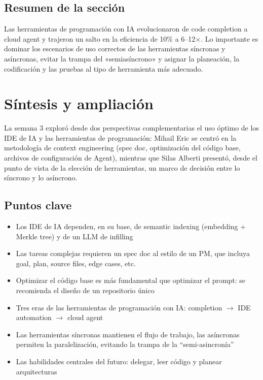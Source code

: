 \documentclass[a4paper]{article}
\begin{document}
\subsection{Resumen de la sección}

Las herramientas de programación con IA evolucionaron de code completion a cloud agent y trajeron un salto en la eficiencia de 10\% a 6--12$\times$. Lo importante es dominar los escenarios de uso correctos de las herramientas síncronas y asíncronas, evitar la trampa del «semiasíncrono» y asignar la planeación, la codificación y las pruebas al tipo de herramienta más adecuado.
\section{Síntesis y ampliación}

La semana 3 exploró desde dos perspectivas complementarias el uso óptimo de los IDE de IA y las herramientas de programación: Mihail Eric se centró en la metodología de context engineering (spec doc, optimización del código base, archivos de configuración de Agent), mientras que Silas Alberti presentó, desde el punto de vista de la elección de herramientas, un marco de decisión entre lo síncrono y lo asíncrono.

\subsection{Puntos clave}

\begin{itemize}
    \item Los IDE de IA dependen, en su base, de semantic indexing (embedding + Merkle tree) y de un LLM de infilling
    \item Las tareas complejas requieren un spec doc al estilo de un PM, que incluya goal, plan, source files, edge cases, etc.
    \item Optimizar el código base es más fundamental que optimizar el prompt: se recomienda el diseño de un repositorio único
    \item Tres eras de las herramientas de programación con IA: completion $\rightarrow$ IDE automation $\rightarrow$ cloud agent
    \item Las herramientas síncronas mantienen el flujo de trabajo, las asíncronas permiten la paralelización, evitando la trampa de la ``semi-asincronía''
    \item Las habilidades centrales del futuro: delegar, leer código y planear arquitecturas
\end{itemize}
\end{document}
